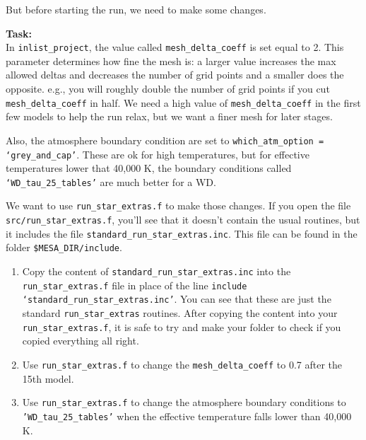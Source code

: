 \documentclass{article}
\begin{document}
But before starting the run, we need to make some changes.

\textbf{Task:} \\ 
In \texttt{inlist\_project}, the value called \texttt{mesh\_delta\_coeff} is set equal to 2. This parameter determines how fine the mesh is: a larger value increases the max allowed deltas and decreases the number of grid points and a smaller does the opposite. e.g., you will roughly double the number of grid points if you cut \texttt{mesh\_delta\_coeff} in half. We need a high value of \texttt{mesh\_delta\_coeff} in the first few models to help the run relax, but we want a finer mesh for later stages.

Also, the atmosphere boundary condition are set to \texttt{which\_atm\_option = `grey\_and\_cap'}. These are ok for high temperatures, but for effective temperatures lower that 40,000 K, the boundary conditions called \texttt{`WD\_tau\_25\_tables'} are much better for a WD.

We want to use \texttt{run\_star\_extras.f} to make those changes. If you open the file \texttt{src/run\_star\_extras.f}, you'll see that it doesn't contain the usual routines, but it includes the file \texttt{standard\_run\_star\_extras.inc}. This file can be found in the folder \texttt{\$MESA\_DIR/include}.

\begin{enumerate}
    \item Copy the content of \texttt{standard\_run\_star\_extras.inc} into the \texttt{run\_star\_extras.f} file in place of the line \texttt{include `standard\_run\_star\_extras.inc'}. You can see that these are just the standard \texttt{run\_star\_extras} routines. After copying the content into your \texttt{run\_star\_extras.f}, it is safe to try and make your folder to check if you copied everything all right.
    \item Use \texttt{run\_star\_extras.f} to change the \texttt{mesh\_delta\_coeff} to 0.7 after the 15th model.
    \item Use \texttt{run\_star\_extras.f} to change the atmosphere boundary conditions to \texttt{'WD\_tau\_25\_tables'} when the effective temperature falls lower than 40,000 K.
\end{enumerate}

\end{document}
